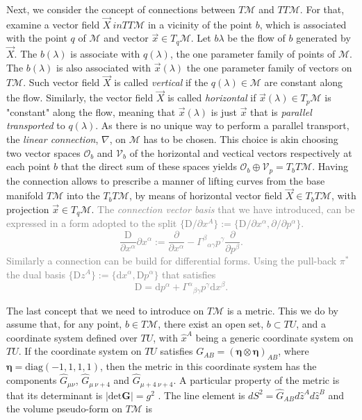 \documentclass[11pt,a4paper,headinclude=true,DIV=14,BCOR=8mm,chapterprefix,listof=totoc,twoside,openright,abstracton]{scrbook}
\newcommand{\gray}[1]{\textcolor{gray}{#1}}
\begin{document}
Next, we consider the concept of connections between $T\mathcal{M}$ and $TT\mathcal{M}$. For that, examine a vector field $\vec{X} \ in TT\mathcal{M}$  in a vicinity of the point $b$, which is associated with the point $q$ of $\mathcal{M}$ and vector $\vec{x}\in T_{q}\mathcal{M}$. Let $b{\lambda}$ be the flow of $b$ generated by $\vec{X}$. The $b(\lambda)$ is associate with $q(\lambda)$, the one parameter family of points of $\mathcal{M}$. The $b(\lambda)$ is also associated with $\vec{x}(\lambda)$ the one parameter family of vectors on $T\mathcal{M}$. Such vector field $\vec{X}$ is called \textit{vertical} if the $q(\lambda)\in\mathcal{M}$ are constant along the flow. Similarly, the vector field $\vec{X}$ is called \textit{horizontal} if $\vec{x}(\lambda)\in T_p \mathcal{M}$ is "constant" along the flow, meaning that $\vec{x}(\lambda)$ is just $\vec{x}$ that is \textit{parallel transported} to $q(\lambda)$. As there is no unique way to perform a parallel transport, the \textit{linear connection}, $\nabla$, on $\mathcal{M}$ has to be chosen. This choice is akin choosing two vector spaces $\mathcal{O}_b$ and $\mathcal{V}_b$ of the horizontal and vectical vectors respectively at each point $b$ that the direct sum of these spaces yields $\mathcal{O}_b\oplus \mathcal{V}_p = T_b T\mathcal{M}$. Having the connection allows to prescribe a manner of lifting curves from the base manifold $T\mathcal{M}$ into the $T_b T\mathcal{M}$, by means of horizontal vector field $\vec{X}\in T_bT\mathcal{M}$, with projection $\vec{x}\in T_q\mathcal{M}$. 
\gray{
    The \textit{connection vector basis} that we have introduced, can be expressed in a form adopted to the split $\{\text{D}/\partial x^A \}:=\{\text{D}/\partial x^{\alpha}, \partial/\partial p^{\alpha} \}$. 
    \begin{equation}
    \frac{\text{D}}{\partial x^{\alpha}}{\partial x^{\alpha}} := \frac{\partial}{\partial x^{\alpha}} - {\Gamma^{\beta}}_{\alpha\gamma}p^{\gamma}\frac{\partial}{\partial p^{\beta}}.
    \end{equation}
    Similarly a connection can be build for differential forms. Using the pull-back $\pi^*$ the dual basis $\{ \text{D}z^{A} \}:=\{\text{d}x^{\alpha}, \text{D}p^{\alpha}\}$ that satisfies 
    \begin{equation}
    \text{D} = \text{d} p ^{\alpha} + {\Gamma^{\alpha}}_{\beta\gamma}p^{\gamma}\text{d}x^{\beta}.
    \end{equation}
}

The last concept that we need to introduce on $T\mathcal{M}$ is a metric. This we do by assume that, for any point, $b \in T\mathcal{M}$, there exist an open set, $b\subset TU$, and a coordinate system defined over $TU$, with $\hat{x}^A$ being a generic coordinate system on $TU$. If the coordinate system on $TU$ satisfies $G_{AB} = (\boldsymbol{\eta}\otimes\boldsymbol{\eta})_{AB}$, where $\boldsymbol{\eta} = \text{diag}(-1, 1, 1, 1)$, then the metric in this coordinate system has the components $\hat{G}_{\mu\nu}$, $\hat{G}_{\mu\: \nu+4}$ and $\hat{G}_{\mu+4 \: \nu+4}$. A particular property of the metric is that its determinant is $|\text{det}\boldsymbol{G}| = g^{2}$ \cite{Lindquist:1966}. The line element is $dS^2 = \hat{G}_{AB}d\hat{z}^A d\hat{z}^B$ and the volume pseudo-form on $T\mathcal{M}$ is
\end{document}
